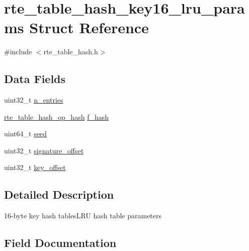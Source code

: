 \hypertarget{structrte__table__hash__key16__lru__params}{}\section{rte\+\_\+table\+\_\+hash\+\_\+key16\+\_\+lru\+\_\+params Struct Reference}
\label{structrte__table__hash__key16__lru__params}


{\ttfamily \#include $<$rte\+\_\+table\+\_\+hash.\+h$>$}

\subsection*{Data Fields}
\begin{DoxyCompactItemize}
\item 
uint32\+\_\+t \hyperlink{structrte__table__hash__key16__lru__params_aafba5a1f8ad65b41148894026098cad7}{n\+\_\+entries}
\item 
\hyperlink{rte__table__hash_8h_a6633f20f58e850abc3d1650af5d900da}{rte\+\_\+table\+\_\+hash\+\_\+op\+\_\+hash} \hyperlink{structrte__table__hash__key16__lru__params_a5a7373267cebe4384507b331c883624a}{f\+\_\+hash}
\item 
uint64\+\_\+t \hyperlink{structrte__table__hash__key16__lru__params_a13dfa5fcb8e1184f1f7756e717fd2807}{seed}
\item 
uint32\+\_\+t \hyperlink{structrte__table__hash__key16__lru__params_a255e199334632db5019afe0eb166a05a}{signature\+\_\+offset}
\item 
uint32\+\_\+t \hyperlink{structrte__table__hash__key16__lru__params_aa09132fc271bc1be2e4032587665bcf7}{key\+\_\+offset}
\end{DoxyCompactItemize}


\subsection{Detailed Description}
16-\/byte key hash tables\+L\+R\+U hash table parameters 

\subsection{Field Documentation}
\hypertarget{structrte__table__hash__key16__lru__params_a5a7373267cebe4384507b331c883624a}{}
